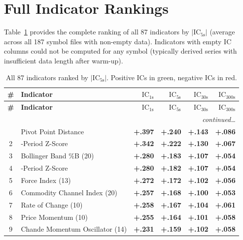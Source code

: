 \documentclass[12pt,a4paper]{article}
\theoremstyle{definition}
\theoremstyle{remark}
\newcommand{\IC}{\mathrm{IC}}
\newcommand{\pos}[1]{\textcolor{green1}{\textbf{+#1}}}
\begin{document}
\appendix
\section{Full Indicator Rankings}
\label{app:fullranking}

Table~\ref{tab:fullrank} provides the complete ranking of all 87
indicators by $|\IC_{5\text{s}}|$ (average across all 187 symbol files
with non-empty data). Indicators with empty IC columns could not be
computed for any symbol (typically derived series with insufficient
data length after warm-up).

\small
\begin{longtable}{c>{\RaggedRight\arraybackslash}p{6.5cm}rrrr}
\caption{All 87 indicators ranked by $|\IC_{5\text{s}}|$.
  Positive ICs in \textcolor{green1}{green},
  negative ICs in \textcolor{accent}{red}.}
\label{tab:fullrank} \\
\toprule
\textbf{\#} & \textbf{Indicator}
  & $\IC_{1\text{s}}$ & $\IC_{5\text{s}}$
  & $\IC_{30\text{s}}$ & $\IC_{300\text{s}}$ \\
\midrule
\endfirsthead
\toprule
\textbf{\#} & \textbf{Indicator}
  & $\IC_{1\text{s}}$ & $\IC_{5\text{s}}$
  & $\IC_{30\text{s}}$ & $\IC_{300\text{s}}$ \\
\midrule
\endhead
\midrule\multicolumn{6}{r}{\small\itshape continued\ldots}\\
\endfoot
\bottomrule
\endlastfoot
 1 & Pivot Point Distance        & \pos{.397} & \pos{.240} & \pos{.143} & \pos{.086} \\
 2 & 10-Period Z-Score         & \pos{.342} & \pos{.222} & \pos{.130} & \pos{.067} \\
 3 & Bollinger Band \%B (20)     & \pos{.280} & \pos{.183} & \pos{.107} & \pos{.054} \\
 4 & 20-Period Z-Score         & \pos{.280} & \pos{.182} & \pos{.107} & \pos{.054} \\
 5 & Force Index (13)   & \pos{.272} & \pos{.172} & \pos{.102} & \pos{.056} \\
 6 & Commodity Channel Index (20)            & \pos{.257} & \pos{.168} & \pos{.100} & \pos{.053} \\
 7 & Rate of Change (10)            & \pos{.258} & \pos{.167} & \pos{.104} & \pos{.061} \\
 8 & Price Momentum (10)       & \pos{.255} & \pos{.164} & \pos{.101} & \pos{.058} \\
 9 & Chande Momentum Oscillator (14)            & \pos{.231} & \pos{.159} & \pos{.102} & \pos{.058} \\

\end{longtable}
\end{document}
